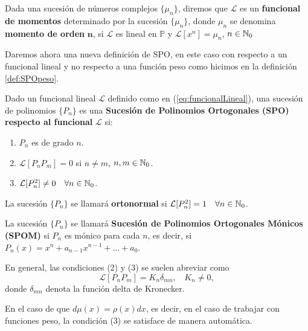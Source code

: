 \begin{definicion}
    Dada una sucesión de números complejos $\{\mu_n\}$, diremos que $\mathcal{L}$ es un \textbf{funcional de momentos} determinado por la sucesión $\{\mu_n\}$, donde $\mu_n$ se denomina \textbf{momento de orden }$\mathbf n$, si $\mathcal{L}$ es lineal en $\mathbb P$ y $\mathcal{L}[x^n]=\mu_n$, $n\in\mathbb{N}_0$
\end{definicion}

Daremos ahora una nueva definición de SPO, en este caso con respecto a un funcional lineal y no respecto a una función peso como hicimos en la definición \ref{def:SPOpeso}.

\begin{definicion}
    \label{def:SPOfuncional}
    Dado un funcional lineal $\mathcal{L}$ definido como en (\ref{eq:funcionalLineal}), una sucesión de polinomios $\{P_n\}$ es una \textbf{Sucesión de Polinomios Ortogonales (SPO) respecto al funcional }$\mathcal{L}$ si:
    \begin{enumerate}
        \item $P_n$ es de grado $n$.
        \item $\mathcal{L}[P_n P_m]=0$ si $n\not=m$, $n,m\in\mathbb{N}_0$.
        \item $\mathcal{L}[P_n^2]\not=0 \ \ \ \forall n\in\mathbb{N}_0$.
    \end{enumerate} 

    La sucesión $\{P_n\}$ se llamará \textbf{ortonormal} si $\mathcal{L}[P_n^2]=1 \ \ \ \forall n\in\mathbb{N}_0$.

    La sucesión $\{P_n\}$ se llamará \textbf{Sucesión de Polinomios Ortogonales Mónicos (SPOM)} si $P_n$ es mónico para cada $n$, es decir, si $P_n(x)=x^n + a_{n-1}x^{n-1}+\dots + a_0$.


\end{definicion}

En general, las condiciones (2) y (3) se suelen abreviar como 
$$
\mathcal{L}[P_n P_m]=K_n\delta_{mn}, \ \ \ \ K_n\not=0,
$$
donde $\delta_{mn}$ denota la función delta de Kronecker. 

En el caso de que $d\mu(x)=\rho(x)dx$, es decir, en el caso de trabajar con funciones peso, la condición (3) se satisface de manera automática.

